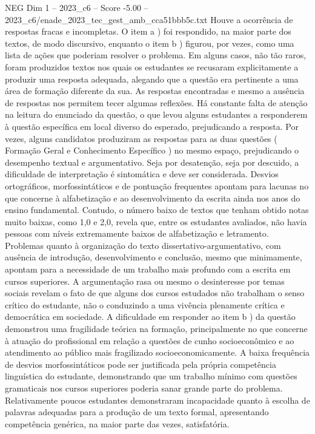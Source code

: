 \begin{textsample}{NEG Dim 1 – 2023\_c6 – Score -5.00 – 2023\_c6/enade\_2023\_tec\_gest\_amb\_cca51bbb5c.txt}
Houve a ocorrência de respostas fracas e incompletas.
O item a ) foi respondido, na maior parte dos textos, de modo discursivo, enquanto o item b ) figurou, por vezes, como uma lista de ações que poderiam resolver o problema.
Em alguns casos, não tão raros, foram produzidos textos nos quais os estudantes se recusaram explicitamente a produzir uma resposta adequada, alegando que a questão era pertinente a uma área de formação diferente da sua.
As respostas encontradas e mesmo a ausência de respostas nos permitem tecer algumas reflexões.
Há constante falta de atenção na leitura do enunciado da questão, o que levou alguns estudantes a responderem à questão específica em local diverso do esperado, prejudicando a resposta.
Por vezes, alguns candidatos produziram as respostas para as duas questões ( Formação Geral e Conhecimento Específico ) no mesmo espaço, prejudicando o desempenho textual e argumentativo.
Seja por desatenção, seja por descuido, a dificuldade de interpretação é sintomática e deve ser considerada.
Desvios ortográficos, morfossintáticos e de pontuação frequentes apontam para lacunas no que concerne à alfabetização e ao desenvolvimento da escrita ainda nos anos do ensino fundamental.
Contudo, o número baixo de textos que tenham obtido notas muito baixas, como 1,0 e 2,0, revela que, entre os estudantes avaliados, não havia pessoas com níveis extremamente baixos de alfabetização e letramento.
Problemas quanto à organização do texto dissertativo-argumentativo, com ausência de introdução, desenvolvimento e conclusão, mesmo que minimamente, apontam para a necessidade de um trabalho mais profundo com a escrita em cursos superiores.
A argumentação rasa ou mesmo o desinteresse por temas sociais revelam o fato de que alguns dos cursos estudados não trabalham o senso crítico do estudante, não o conduzindo a uma vivência plenamente crítica e democrática em sociedade.
A dificuldade em responder ao item b ) da questão demonstrou uma fragilidade teórica na formação, principalmente no que concerne à atuação do profissional em relação a questões de cunho socioeconômico e ao atendimento ao público mais fragilizado socioeconomicamente.
A baixa frequência de desvios morfossintáticos pode ser justificada pela própria competência linguística do estudante, demonstrando que um trabalho mínimo com questões gramaticais nos cursos superiores poderia sanar grande parte do problema.
Relativamente poucos estudantes demonstraram incapacidade quanto à escolha de palavras adequadas para a produção de um texto formal, apresentando competência genérica, na maior parte das vezes, satisfatória.

\end{textsample}
